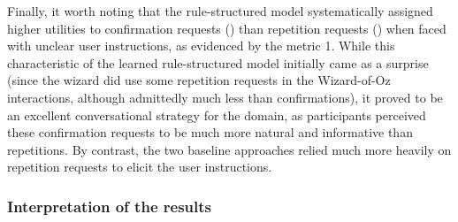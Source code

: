 Finally, it worth noting that the rule-structured model systematically assigned higher utilities to confirmation requests () than repetition requests () when faced with unclear user instructions, as evidenced by the metric 1. While this characteristic of the learned rule-structured model initially came as a surprise (since the wizard did use some repetition requests in the Wizard-of-Oz interactions, although admittedly much less than confirmations), it proved to be an excellent conversational strategy for the domain, as participants perceived these confirmation requests to be much more natural and informative than repetitions. By contrast, the two baseline approaches relied much more heavily on repetition requests to elicit the user instructions.

\subsubsection*{Interpretation of the results}

